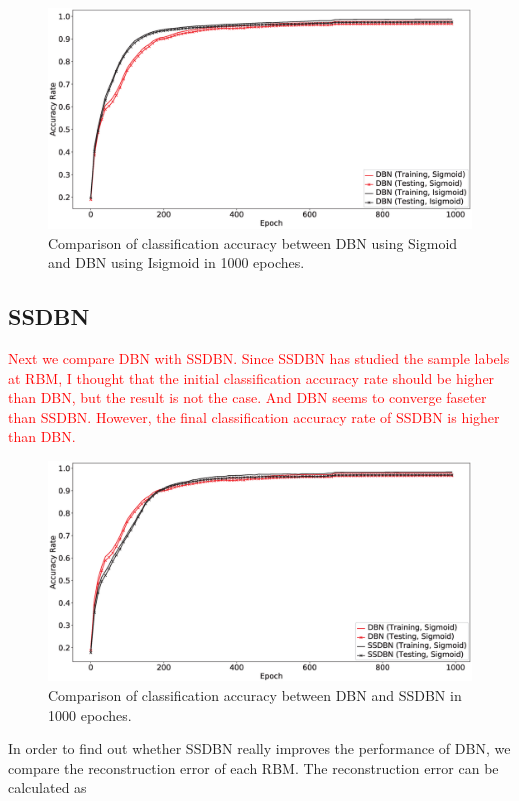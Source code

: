 \documentclass{bioinfo}
\begin{document}
\begin{figure}[htbp]
	\centering
	\includegraphics[width=\columnwidth]{SigmoidVSIsigmoid.eps}
	\caption{Comparison of classification accuracy between DBN using Sigmoid and DBN using Isigmoid in 1000 epoches.}
	\label{fig:SigmoidVSIsigmoid}
\end{figure}

\subsection{SSDBN}
\textcolor{red}{Next we compare DBN with SSDBN. Since SSDBN has studied the sample labels at RBM, I thought that the initial classification accuracy rate should be higher than DBN, but the result is not the case. And DBN seems to converge faseter than SSDBN. However, the final classification accuracy rate of SSDBN is higher than DBN.}

\begin{figure}[htbp]
	\centering
	\includegraphics[width=\columnwidth]{SSDBN.eps}
	\caption{Comparison of classification accuracy between DBN and SSDBN in 1000 epoches.}
	\label{fig:SSDBN}
\end{figure}

In order to find out whether SSDBN really improves the performance of DBN, we compare the reconstruction error of each RBM. The reconstruction error can be calculated as 
\end{document}
